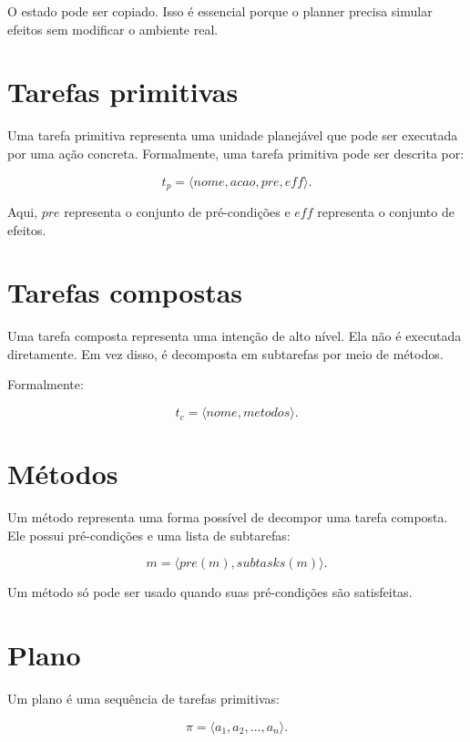 O estado pode ser copiado.
Isso é essencial porque o planner precisa simular efeitos sem modificar o
ambiente real.

\section{Tarefas primitivas}

Uma tarefa primitiva representa uma unidade planejável que pode ser executada
por uma ação concreta.
Formalmente, uma tarefa primitiva pode ser descrita por:

\begin{equation}
t_p = \langle nome, acao, pre, eff \rangle.
\end{equation}

Aqui, $pre$ representa o conjunto de pré-condições e $eff$ representa o
conjunto de efeitos.

\section{Tarefas compostas}

Uma tarefa composta representa uma intenção de alto nível.
Ela não é executada diretamente.
Em vez disso, é decomposta em subtarefas por meio de métodos.

Formalmente:

\begin{equation}
t_c = \langle nome, metodos \rangle.
\end{equation}

\section{Métodos}

Um método representa uma forma possível de decompor uma tarefa composta.
Ele possui pré-condições e uma lista de subtarefas:

\begin{equation}
m = \langle pre(m), subtasks(m) \rangle.
\end{equation}

Um método só pode ser usado quando suas pré-condições são satisfeitas.

\section{Plano}

Um plano é uma sequência de tarefas primitivas:

\begin{equation}
\pi = \langle a_1,a_2,\dots,a_n \rangle.
\end{equation}

